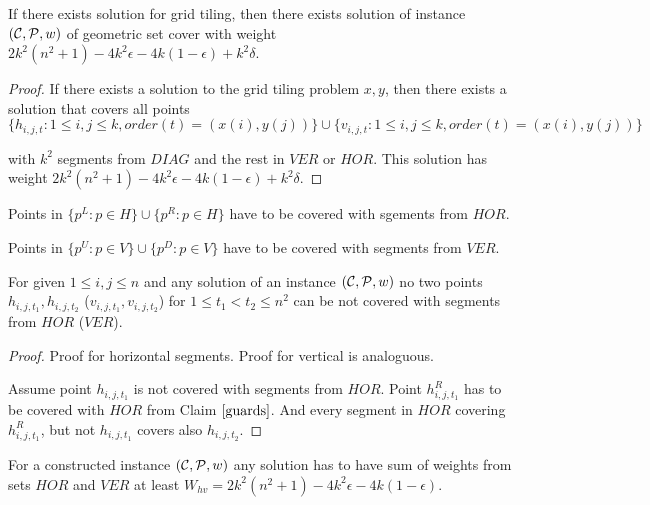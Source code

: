 \newcommand{\solWeight}{2k^2(n^2+1) - 4k^2\epsilon -4k(1-\epsilon) +k^2\delta }

\begin{lemma}
\label{set_cover_solution_exists}
	If there exists solution for grid tiling,
	then there exists solution of instance $(\mathcal{C}, \mathcal{P}, w)$
	of geometric set cover
	with weight $\solWeight$.
\end{lemma}

\begin{proof}
	If there exists a solution to the grid tiling problem
	$x, y$,
	then there exists a solution that covers
	all points
	$$\{h_{i, j, t} : 1 \le i, j \le k, order(t)=(x(i), y(j))\}
	\cup \{v_{i, j, t} : 1 \le i, j \le k, order(t)=(x(i), y(j))\}$$
	
	with $k^2$ segments from $DIAG$
	and the rest in $VER$ or $HOR$.
	This solution has weight $\solWeight$.
\end{proof}


\begin{claim}
\label{guards}
Points in $\{p^L : p \in H\} \cup \{p^R : p \in H\}$
have to be covered with sgements from $HOR$.

Points in $\{p^U : p \in V\} \cup \{p^D : p \in V\} $
have to be covered with segments from $VER$.
\end{claim}


\begin{claim}
\label{one_diag_in_square}
For given $1 \le i, j \le n$
and any solution of an instance $(\mathcal{C}, \mathcal{P}, w)$
no two points $h_{i, j, t_1}, h_{i, j, t_2}$
($v_{i, j, t_1}, v_{i, j, t_2}$)
for $1 \le t_1 < t_2 \le n^2$
can be not covered with segments from $HOR$ ($VER$).
\end{claim}

\begin{proof}
Proof for horizontal segments. Proof for vertical is analoguous.

Assume point $h_{i, j, t_1}$ is not covered with
segments from $HOR$.
Point $h^R_{i, j, t_1}$ has to be covered with $HOR$
from Claim $\ref{guards}$.
And every segment in $HOR$ covering $h^R_{i, j, t_1}$,
but not $h_{i,j,t_1}$ covers also $h_{i, j, t_2}$.
\end{proof}

\begin{lemma}
\label{vertical_horizontal_sum}
For a constructed instance $(\mathcal{C}, \mathcal{P}, w)$
any solution has to have sum of weights from sets $HOR$ and $VER$ at least
$W_{hv} = 2k^2(n^2+1) -4k^2\epsilon -4k(1-\epsilon)$.
\end{lemma}

